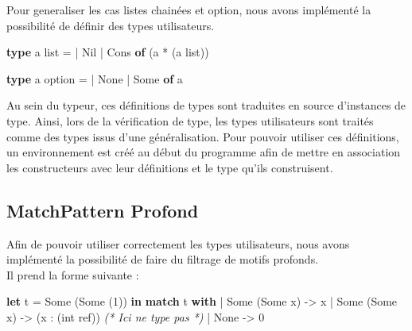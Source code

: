 \documentclass[
  12pt,
]{article}
\newenvironment{Shaded}{}{}
\newcommand{\CommentTok}[1]{\textcolor[rgb]{0.38,0.63,0.69}{\textit{#1}}}
\newcommand{\DataTypeTok}[1]{\textcolor[rgb]{0.56,0.13,0.00}{#1}}
\newcommand{\DecValTok}[1]{\textcolor[rgb]{0.25,0.63,0.44}{#1}}
\newcommand{\KeywordTok}[1]{\textcolor[rgb]{0.00,0.44,0.13}{\textbf{#1}}}
\newcommand{\NormalTok}[1]{#1}
\begin{document}
Pour generaliser les cas listes chainées et option, nous avons
implémenté la possibilité de définir des types utilisateurs.

\begin{Shaded}
\begin{Highlighting}[]
\KeywordTok{type}\NormalTok{ \textquotesingle{}a }\DataTypeTok{list}\NormalTok{ = }
\NormalTok{  | Nil }
\NormalTok{  | Cons }\KeywordTok{of}\NormalTok{ (\textquotesingle{}a * (\textquotesingle{}a }\DataTypeTok{list}\NormalTok{))}

\KeywordTok{type}\NormalTok{ \textquotesingle{}a }\DataTypeTok{option}\NormalTok{ = }
\NormalTok{  | }\DataTypeTok{None}
\NormalTok{  | }\DataTypeTok{Some} \KeywordTok{of}\NormalTok{ \textquotesingle{}a}
\end{Highlighting}
\end{Shaded}

Au sein du typeur, ces définitions de types sont traduites en source
d'instances de type. Ainsi, lors de la vérification de type, les types
utilisateurs sont traités comme des types issus d'une généralisation.
Pour pouvoir utiliser ces définitions, un environnement est créé au
début du programme afin de mettre en association les constructeurs avec
leur définitions et le type qu'ils construisent.

\pagebreak

\subsection{MatchPattern Profond}\label{matchpattern-profond}

Afin de pouvoir utiliser correctement les types utilisateurs, nous avons
implémenté la possibilité de faire du filtrage de motifs profonds.\\

Il prend la forme suivante :

\begin{Shaded}
\begin{Highlighting}[]
\KeywordTok{let}\NormalTok{ t = }\DataTypeTok{Some}\NormalTok{ (}\DataTypeTok{Some}\NormalTok{ (}\DecValTok{1}\NormalTok{)) }\KeywordTok{in} 
\KeywordTok{match}\NormalTok{ t }\KeywordTok{with}
\NormalTok{| }\DataTypeTok{Some}\NormalTok{ (}\DataTypeTok{Some}\NormalTok{ x) {-}\textgreater{} x}
\NormalTok{| }\DataTypeTok{Some}\NormalTok{ (}\DataTypeTok{Some}\NormalTok{ x) {-}\textgreater{} (x : (}\DataTypeTok{int} \DataTypeTok{ref}\NormalTok{)) }\CommentTok{(* Ici ne type pas *)}
\NormalTok{| }\DataTypeTok{None}\NormalTok{ {-}\textgreater{} }\DecValTok{0}
\end{Highlighting}
\end{Shaded}
\end{document}
